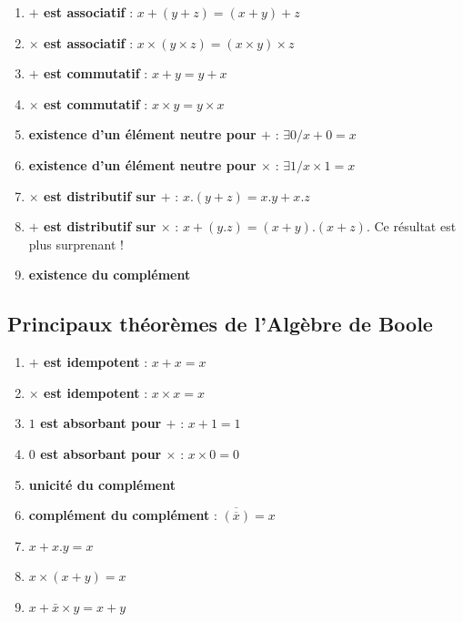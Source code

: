 \begin{enumerate}
\item  {\bf $+$ est associatif} :  $x+(y+z)=(x+y)+z$
\item  {\bf $\times$ est associatif} :  $x\times(y\times z)=(x\times y)\times z$
\item  {\bf $+$ est commutatif} :  $x+y=y+x$
\item  {\bf $\times$ est commutatif} :  $x\times y=y\times x$
\item  {\bf existence d'un élément neutre pour $+$} :  $\exists 0 / x+ 0 = x$
\item  {\bf existence d'un élément neutre pour $\times $} :  $\exists 1 / x \times 1 = x$
\item  {\bf $\times$ est distributif sur $+$} : $x.(y+z)=x.y+x.z$
\item  {\bf $+$ est distributif sur $\times$} : $x+(y.z)=(x+y).(x+z)$. Ce résultat est plus surprenant !
\item  {\bf existence du complément}
\end{enumerate}

\subsection{Principaux théorèmes de l'Algèbre de Boole}

\begin{enumerate}
\item {\bf $+$ est idempotent} : $x+x=x$
\item {\bf $\times$ est idempotent} : $x \times x=x$
\item {\bf $1$ est absorbant pour $+$} : $x+1=1$
\item {\bf $0$ est absorbant pour $\times$} : $x\times 0=0$
\item {\bf unicité du complément}
\item {\bf complément du complément} : $\overline{ ( \overline{x} ) }=x$
\item $x+x.y = x$
\item $x \times (x + y) = x$
\item $x + \bar{x} \times y = x +y$
\end{enumerate}

